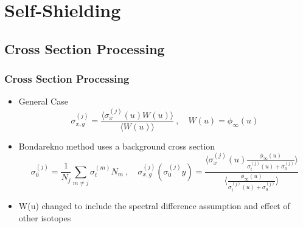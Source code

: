 \documentclass[xcolor=x11names,compress]{beamer}
\renewcommand{\(}{\begin{columns}}
\renewcommand{\)}{\end{columns}}
\newcommand{\<}[1]{\begin{column}{#1}}
\renewcommand{\>}{\end{column}}
\newcommand{\micro}{\ensuremath{\sigma}}
\begin{document}
\section{Self-Shielding}
\subsection{Cross Section Processing}
\begin{frame}[fragile]
  \frametitle{Cross Section Processing}

	\begin{itemize}
	\item General Case
	\begin{equation}
  	\micro_{x,g}^{(j)} = \frac{\langle \micro_x^{(j)}(u) W(u)\rangle}
	{\langle W(u)\rangle} \:, \quad W(u) = \phi_{\infty}(u)
 	 \label{eq:baseBondarenko}
 	\end{equation} 
 	
 	\item Bondarekno method uses a background cross section
 	\begin{equation}
  	\micro_0^{(j)} = \frac{1}{N_j} \sum_{m \ne j} \micro_{t}^{(m)} N_m 
  	\:, \quad \micro_{x,g}^{(j)}(\micro_0^{(j)}y) = \frac{\langle
  	 \micro_{x}^{(j)}(u) \frac{\phi_{\infty}(u)} {\micro_{t}^{(j)}(u)
  	 + \micro_0^{(j)}} \rangle}
  	 { \langle \frac{\phi_{\infty}(u)}{\micro_{t}^{(j)}(u) +
  	 \micro_0^{(j)}}\rangle}
  \label{eq:ssfact}
	\end{equation}

	\item W(u) changed to include the  spectral difference assumption and effect of other isotopes
	\end{itemize}
	
\end{frame}
	
\end{document}
